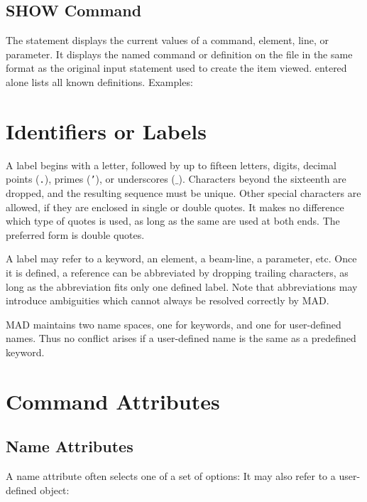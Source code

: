 \subsection{SHOW Command}
\label{S-SHOW}
The  statement displays the current values
of a command, element, line, or parameter.
It displays the named command or definition on the  file
in the same format as the original input statement used
to create the item viewed.
 entered alone lists all known definitions.
Examples:
 
\section{Identifiers or Labels}
\label{S-LABEL}
A label begins with a letter, followed by up to fifteen letters,
digits, decimal points ({\tt .}), primes ({\tt '}),
or underscores ({\tt \(\_\)}).
Characters beyond the sixteenth are dropped,
and the resulting sequence must be unique.
Other special characters are allowed,
if they are enclosed in single or double quotes.
It makes no difference which type of quotes is used,
as long as the same are used at both ends.
The preferred form is double quotes.
 
A label may refer to a keyword, an element,
a beam-line, a parameter, etc.
Once it is defined, a reference can be abbreviated by dropping trailing
characters, as long as the abbreviation fits only one defined label.
Note that abbreviations may introduce ambiguities which cannot
always be resolved correctly by MAD.
 
MAD maintains two name spaces,
one for keywords, and one for user-defined names.
Thus no conflict arises if a user-defined name is the same
as a predefined keyword.
 
\section{Command Attributes}
\subsection{Name Attributes}
\label{S-NAMAT}
A name attribute often selects one of a set of options:
It may also refer to a user-defined object:
 
